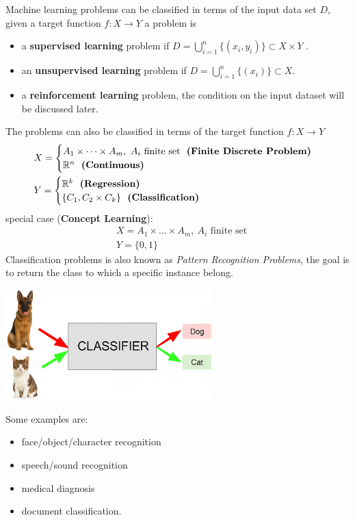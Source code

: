 \documentclass[10pt, letterpaper]{report}
\begin{document}
Machine learning problems can be classified in terms of the input data set $D$, given a target function $f:X\rightarrow Y$ a problem is\begin{itemize}
    \item a \textbf{supervised learning} problem if $D=\bigcup_{i=1}^n\{(x_i,y_i)\}\subset X\times Y$ .
    \item an \textbf{unsupervised learning} problem if $D=\bigcup_{i=1}^n\{(x_i)\}\subset X$.
    \item a \textbf{reinforcement learning} problem, the condition on the input dataset will be discussed later.
\end{itemize}
The problems can also be classified in terms of the target function $f:X\rightarrow Y$
\begin{align*}
   & X=\begin{cases}
        A_1\times \dots \times A_m, \ A_i \text{ finite set} \ \ \textbf{(Finite Discrete Problem)}\\ 
        \R^n \ \ \textbf{(Continuous)}
    \end{cases}\\ 
    & Y=\begin{cases}
         \R^k \ \ \textbf{(Regression)}\\ 
        \{C_1,C_2\times C_k\} \ \ \textbf{(Classification)}
    \end{cases}
\end{align*}
special case (\textbf{Concept Learning}):\begin{align*}
    & X = A_1\times \dots \times A_m, \ A_i \text{ finite set}\\ 
    & Y = \{0,1\}
\end{align*}
Classification problems is also known as \textit{Pattern Recognition Problems}, the goal is to return the class to which a specific instance belong.\begin{center}
     \includegraphics[width=0.6\textwidth]{images/classifier.png}
\end{center}
Some examples are:\begin{itemize}
    \item face/object/character recognition
    \item speech/sound recognition
    \item medical diagnosis
    \item document classification.
\end{itemize}
\end{document}
